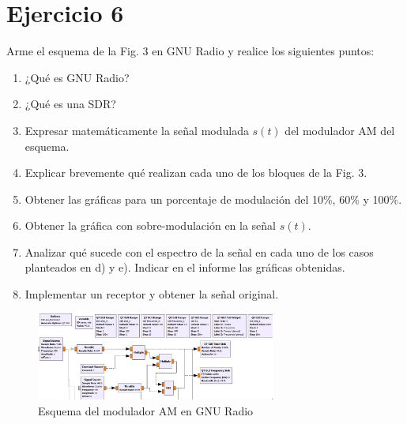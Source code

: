 \section{Ejercicio 6}

Arme el esquema de la Fig. 3 en GNU Radio y realice los siguientes puntos:

\begin{enumerate}[label=\alph*)]
    \item ¿Qué es GNU Radio?
    \item ¿Qué es una SDR?
    \item Expresar matemáticamente la señal modulada $s(t)$ del modulador AM del esquema.
    \item Explicar brevemente qué realizan cada uno de los bloques de la Fig. 3.
    \item Obtener las gráficas para un porcentaje de modulación del 10\%, 60\% y 100\%.
    \item Obtener la gráfica con sobre-modulación en la señal $s(t)$.
    \item Analizar qué sucede con el espectro de la señal en cada uno de los casos planteados en d) y e). Indicar en el informe las gráficas obtenidas.
    \item Implementar un receptor y obtener la señal original.
\end{enumerate}

\begin{figure}[h!]
    \centering
    \includegraphics[width=0.7\textwidth]{imagenes/Parte_1/Actividad_6/fig3.png}
    \caption{Esquema del modulador AM en GNU Radio}
\end{figure}
